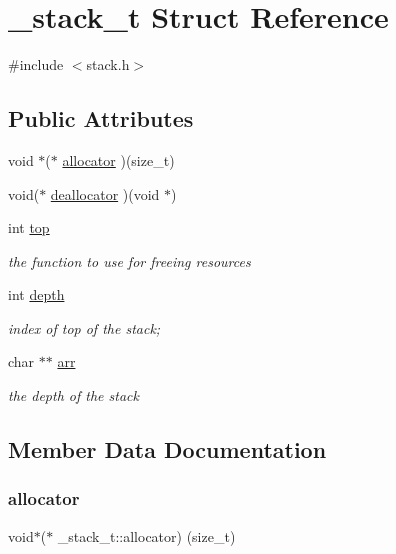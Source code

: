 \hypertarget{struct__stack__t}{}\section{\+\_\+stack\+\_\+t Struct Reference}
\label{struct__stack__t}


{\ttfamily \#include $<$stack.\+h$>$}

\subsection*{Public Attributes}
\begin{DoxyCompactItemize}
\item 
void $\ast$($\ast$ \hyperlink{struct__stack__t_a296ab39a4cf507c6a318d98e96b27aef}{allocator} )(size\+\_\+t)
\item 
void($\ast$ \hyperlink{struct__stack__t_a118ea389fe533015238144af0d9592dd}{deallocator} )(void $\ast$)
\item 
int \hyperlink{struct__stack__t_a150cee08557f9cb5d7defa6dce0ad879}{top}
\begin{DoxyCompactList}\small\item\em the function to use for freeing resources \end{DoxyCompactList}\item 
int \hyperlink{struct__stack__t_abaaeb4c7879a01ef4aca7739ae59e947}{depth}
\begin{DoxyCompactList}\small\item\em index of top of the stack; \end{DoxyCompactList}\item 
char $\ast$$\ast$ \hyperlink{struct__stack__t_a99f4c0f7e39c7c0800b05683c6fa9b40}{arr}
\begin{DoxyCompactList}\small\item\em the depth of the stack \end{DoxyCompactList}\end{DoxyCompactItemize}


\subsection{Member Data Documentation}
\hypertarget{struct__stack__t_a296ab39a4cf507c6a318d98e96b27aef}{}\label{struct__stack__t_a296ab39a4cf507c6a318d98e96b27aef} 
\subsubsection{\texorpdfstring{allocator}{allocator}}
{\footnotesize\ttfamily void$\ast$($\ast$ \+\_\+stack\+\_\+t\+::allocator) (size\+\_\+t)}

